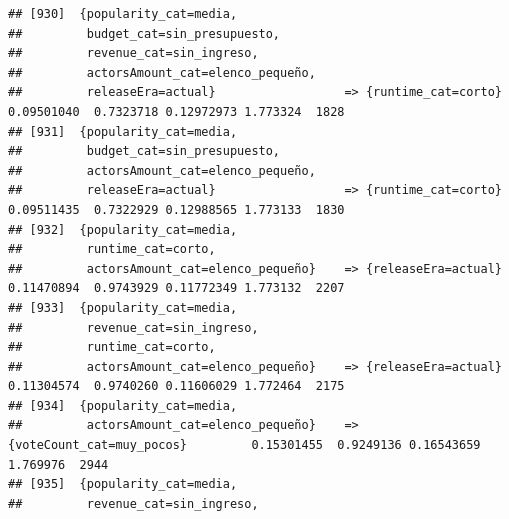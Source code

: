 \documentclass[
]{article}
\begin{document}
\begin{verbatim}
## [930]  {popularity_cat=media,                                                                                                   
##         budget_cat=sin_presupuesto,                                                                                             
##         revenue_cat=sin_ingreso,                                                                                                
##         actorsAmount_cat=elenco_pequeño,                                                                                        
##         releaseEra=actual}                  => {runtime_cat=corto}               0.09501040  0.7323718 0.12972973 1.773324  1828
## [931]  {popularity_cat=media,                                                                                                   
##         budget_cat=sin_presupuesto,                                                                                             
##         actorsAmount_cat=elenco_pequeño,                                                                                        
##         releaseEra=actual}                  => {runtime_cat=corto}               0.09511435  0.7322929 0.12988565 1.773133  1830
## [932]  {popularity_cat=media,                                                                                                   
##         runtime_cat=corto,                                                                                                      
##         actorsAmount_cat=elenco_pequeño}    => {releaseEra=actual}               0.11470894  0.9743929 0.11772349 1.773132  2207
## [933]  {popularity_cat=media,                                                                                                   
##         revenue_cat=sin_ingreso,                                                                                                
##         runtime_cat=corto,                                                                                                      
##         actorsAmount_cat=elenco_pequeño}    => {releaseEra=actual}               0.11304574  0.9740260 0.11606029 1.772464  2175
## [934]  {popularity_cat=media,                                                                                                   
##         actorsAmount_cat=elenco_pequeño}    => {voteCount_cat=muy_pocos}         0.15301455  0.9249136 0.16543659 1.769976  2944
## [935]  {popularity_cat=media,                                                                                                   
##         revenue_cat=sin_ingreso,                                                                                                

\end{verbatim}
\end{document}
